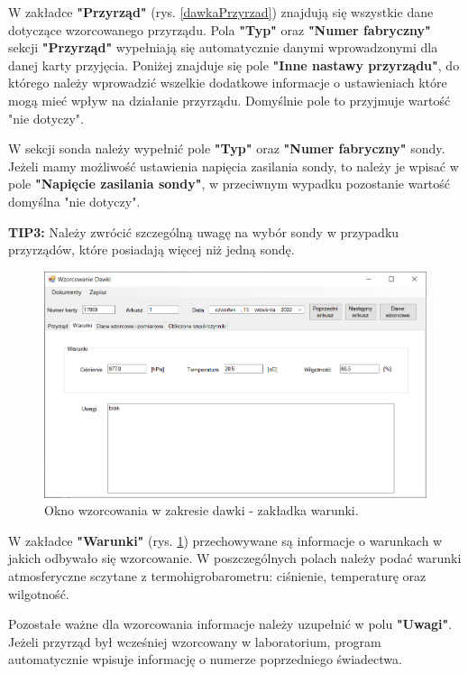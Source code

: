 {W zakładce \textbf{"Przyrząd"} (rys. \ref{dawkaPrzyrzad}) znajdują się wszystkie dane dotyczące wzorcowanego przyrządu. Pola \textbf{"Typ"} oraz \textbf{"Numer fabryczny"} sekcji \textbf{"Przyrząd"} wypełniają się automatycznie danymi wprowadzonymi dla danej karty przyjęcia. Poniżej znajduje się pole \textbf{"Inne nastawy przyrządu"}, do którego należy wprowadzić wszelkie dodatkowe informacje o ustawieniach które mogą mieć wpływ na działanie przyrządu. Domyślnie pole to przyjmuje wartość "nie dotyczy".

W sekcji sonda należy wypełnić pole \textbf{"Typ"} oraz \textbf{"Numer fabryczny"} sondy. Jeżeli mamy możliwość ustawienia napięcia zasilania sondy, to należy je wpisać w pole \textbf{"Napięcie zasilania sondy"}, w przeciwnym wypadku pozostanie wartość domyślna "nie dotyczy".

\textbf{TIP3:} Należy zwrócić szczególną uwagę na wybór sondy w przypadku przyrządów, które posiadają więcej niż jedną sondę.

\begin{figure}[htb]
	\centering
	\includegraphics[width=\columnwidth]{obrazki/Wzorcowanie/dawka/warunki.png}
	\caption{Okno wzorcowania w zakresie dawki - zakładka warunki.}
	\label{dawkaWarunki}
\end{figure}

W zakładce \textbf{"Warunki"} (rys. \ref{dawkaWarunki}) przechowywane są informacje o warunkach w jakich odbywało się wzorcowanie. W poszczególnych polach należy podać warunki atmosferyczne sczytane z termohigrobarometru: ciśnienie, temperaturę oraz wilgotność.

Pozostałe ważne dla wzorcowania informacje należy uzupełnić w polu \textbf{"Uwagi"}. Jeżeli przyrząd był wcześniej wzorcowany w laboratorium, program automatycznie wpisuje informację o numerze poprzedniego świadectwa. 

}
